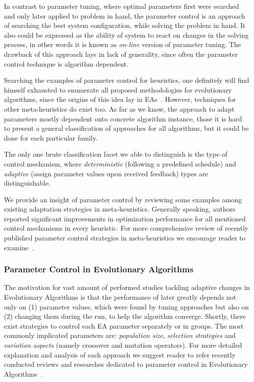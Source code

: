 In contrast to parameter tuning, where optimal parameters first were searched and only later applied to problem in hand, the parameter control is an approach of searching the best system configuration, while solving the problem in hand. It also could be expressed as the ability of system to react on changes in the solving process, in other words it is known as \textit{on-line} version of parameter tuning. The drawback of this approach lays in lack of generality, since  often the parameter control technique is algorithm dependent.

Searching the examples of parameter control for heuristics, one definitely will find himself exhausted to enumerate all proposed methodologies for evolutionary algorithms, since the origins of this idea lay in EAs~\cite{karafotias2014parameter}. However, techniques for other meta-heuristics do exist too.
As far as we know, the approach to adapt parameters mostly dependent onto concrete algorithm instance, those it is hard to present a general classification of approaches for all algorithms, but it could be done for each particular family.

The only one brute classification facet we able to distinguish is the type of control mechanism, where \textit{deterministic} (following a predefined schedule) and \textit{adaptive} (assign parameter values upon received feedback) types are distinguishable.

We provide an insight of parameter control by reviewing some examples among existing adaptation strategies in meta-heuristics.
Generally speaking, authors reported significant improvements in optimization performance for all mentioned control mechanisms in every heuristic. For more comprehensive review of recently published parameter control strategies in meta-heuristics we encourage reader to examine~\cite{huang2019survey}.

\subsubsection{Parameter Control in Evolutionary Algorithms} 
The motivation for vast amount of performed studies tackling adaptive changes in Evolutionary Algorithms is that the performance of later greatly depends not only on (1) parameter values, which were found by tuning approaches but also on (2) changing them during the run, to help the algorithm converge.
Shortly, there exist strategies to control each EA parameter separately or in groups. The most commonly implicated parameters are: \textit{population size}, \textit{selection strategies} and \textit{variation aspects} (namely crossover and mutation operators). For more detailed explanation and analysis of each approach we suggest reader to refer recently conducted reviews and researches dedicated to parameter control in Evolutionary Algorithms~\cite{karafotias2014parameter,aleti2016systematic,smith2020self}.

